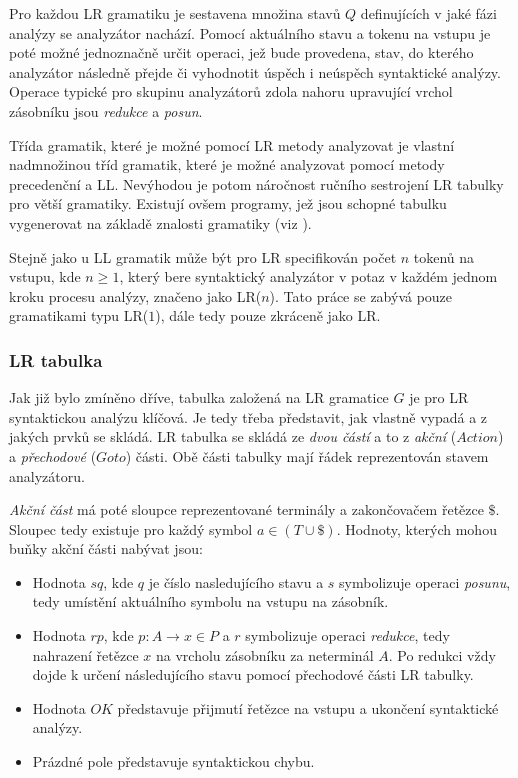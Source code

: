 Pro každou LR gramatiku je sestavena množina stavů $Q$ definujících v jaké fázi analýzy se analyzátor nachází. Pomocí aktuálního stavu a tokenu na vstupu je
poté možné jednoznačně určit operaci, jež bude provedena, stav, do kterého analyzátor následně přejde či vyhodnotit úspěch i neúspěch syntaktické analýzy.
Operace typické pro skupinu analyzátorů zdola nahoru upravující vrchol zásobníku jsou \emph{redukce} a \emph{posun}.

Třída gramatik, které je možné pomocí LR metody analyzovat je vlastní nadmnožinou tříd gramatik, které je možné analyzovat pomocí metody precedenční a LL.
Nevýhodou je potom náročnost ručního sestrojení LR tabulky pro větší gramatiky. Existují ovšem programy, jež jsou schopné tabulku vygenerovat na základě znalosti
gramatiky (viz \cite{Alfred:2007:Compilers}).

Stejně jako u LL gramatik může být pro LR specifikován
počet $n$ tokenů na vstupu, kde $n \geq 1$, který bere syntaktický analyzátor v potaz v každém jednom kroku procesu analýzy, značeno jako
LR($n$). Tato práce se zabývá pouze gramatikami typu LR($1$), dále tedy pouze zkráceně jako LR.


\subsubsection{LR tabulka}
Jak již bylo zmíněno dříve, tabulka založená na LR gramatice $G$ je pro LR syntaktickou analýzu klíčová. Je tedy třeba představit, jak vlastně vypadá a z jakých prvků se skládá.
LR tabulka se skládá ze \emph{dvou částí} a to z \emph{akční} ($Action$) a \emph{přechodové} ($Goto$) části. Obě části tabulky mají řádek reprezentován stavem analyzátoru.

\emph{Akční část} má poté sloupce reprezentované terminály a zakončovačem řetězce $\$$. Sloupec tedy existuje pro každý symbol $a \in (T \cup \$)$. Hodnoty, kterých mohou buňky akční části nabývat jsou:
\begin{itemize}
  \item Hodnota $sq$, kde $q$ je číslo nasledujícího stavu a $s$ symbolizuje operaci \emph{posunu}, tedy umístění aktuálního symbolu na vstupu na zásobník.
  \item Hodnota $rp$, kde $p\!: A \rightarrow x \in P$ a $r$ symbolizuje operaci \emph{redukce}, tedy nahrazení řetězce $x$ na vrcholu zásobníku za neterminál $A$.
        Po redukci vždy dojde k určení následujícího stavu pomocí přechodové části LR tabulky.
  \item Hodnota $OK$ představuje přijmutí řetězce na vstupu a ukončení syntaktické analýzy.
  \item Prázdné pole představuje syntaktickou chybu.
\end{itemize}

